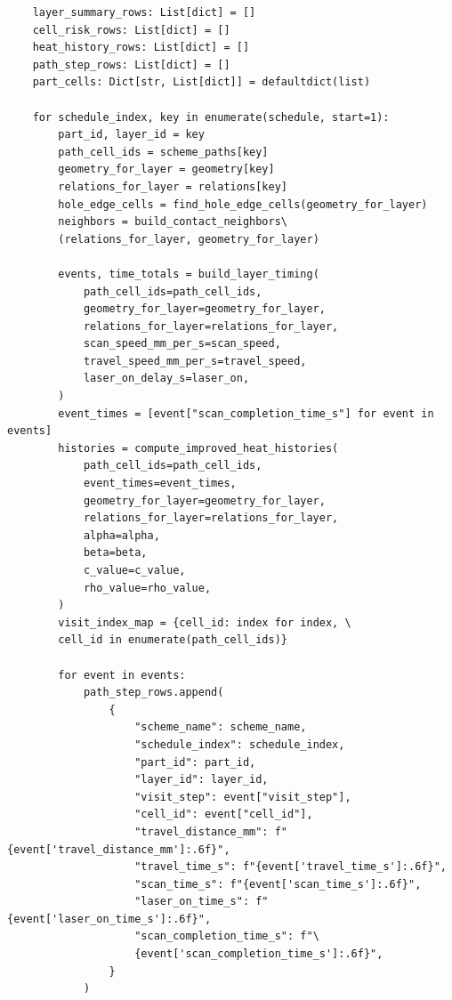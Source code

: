 \documentclass[a4paper, 12pt]{ctexart}
\begin{document}
\begin{verbatim}
    layer_summary_rows: List[dict] = []
    cell_risk_rows: List[dict] = []
    heat_history_rows: List[dict] = []
    path_step_rows: List[dict] = []
    part_cells: Dict[str, List[dict]] = defaultdict(list)

    for schedule_index, key in enumerate(schedule, start=1):
        part_id, layer_id = key
        path_cell_ids = scheme_paths[key]
        geometry_for_layer = geometry[key]
        relations_for_layer = relations[key]
        hole_edge_cells = find_hole_edge_cells(geometry_for_layer)
        neighbors = build_contact_neighbors\
        (relations_for_layer, geometry_for_layer)

        events, time_totals = build_layer_timing(
            path_cell_ids=path_cell_ids,
            geometry_for_layer=geometry_for_layer,
            relations_for_layer=relations_for_layer,
            scan_speed_mm_per_s=scan_speed,
            travel_speed_mm_per_s=travel_speed,
            laser_on_delay_s=laser_on,
        )
        event_times = [event["scan_completion_time_s"] for event in events]
        histories = compute_improved_heat_histories(
            path_cell_ids=path_cell_ids,
            event_times=event_times,
            geometry_for_layer=geometry_for_layer,
            relations_for_layer=relations_for_layer,
            alpha=alpha,
            beta=beta,
            c_value=c_value,
            rho_value=rho_value,
        )
        visit_index_map = {cell_id: index for index, \
        cell_id in enumerate(path_cell_ids)}

        for event in events:
            path_step_rows.append(
                {
                    "scheme_name": scheme_name,
                    "schedule_index": schedule_index,
                    "part_id": part_id,
                    "layer_id": layer_id,
                    "visit_step": event["visit_step"],
                    "cell_id": event["cell_id"],
                    "travel_distance_mm": f"{event['travel_distance_mm']:.6f}",
                    "travel_time_s": f"{event['travel_time_s']:.6f}",
                    "scan_time_s": f"{event['scan_time_s']:.6f}",
                    "laser_on_time_s": f"{event['laser_on_time_s']:.6f}",
                    "scan_completion_time_s": f"\
                    {event['scan_completion_time_s']:.6f}",
                }
            )


\end{verbatim}
\end{document}
